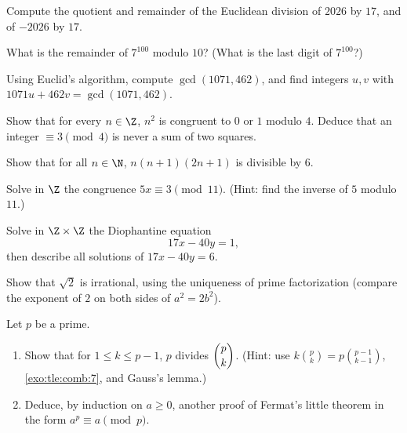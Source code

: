 \begin{exercise}[$\star$]\label{exo:tle:arith:1}
Compute the quotient and remainder of the Euclidean division of $2026$ by
$17$, and of $-2026$ by $17$.
\end{exercise}

\begin{exercise}[$\star$]\label{exo:tle:arith:2}
What is the remainder of $7^{100}$ modulo $10$? (What is the last digit of
$7^{100}$?)
\end{exercise}

\begin{exercise}[$\star$]\label{exo:tle:arith:3}
Using Euclid's algorithm, compute $\gcd(1071, 462)$, and find integers
$u, v$ with $1071u + 462v = \gcd(1071, 462)$.
\end{exercise}

\begin{exercise}[$\star$]\label{exo:tle:arith:4}
Show that for every $n \in \Z$, $n^2$ is congruent to $0$ or $1$ modulo
$4$. Deduce that an integer $\equiv 3 \pmod 4$ is never a sum of two
squares.
\end{exercise}

\begin{exercise}[$\star\star$]\label{exo:tle:arith:5}
Show that for all $n \in \N$, $n(n+1)(2n+1)$ is divisible by $6$.
\end{exercise}

\begin{exercise}[$\star\star$]\label{exo:tle:arith:6}
Solve in $\Z$ the congruence $5x \equiv 3 \pmod{11}$.
(Hint: find the inverse of $5$ modulo $11$.)
\end{exercise}

\begin{exercise}[$\star\star$]\label{exo:tle:arith:7}
Solve in $\Z \times \Z$ the Diophantine equation
\[
17x - 40y = 1,
\]
then describe all solutions of $17x - 40y = 6$.
\end{exercise}

\begin{exercise}[$\star\star$]\label{exo:tle:arith:8}
Show that $\sqrt2$ is irrational, using the uniqueness of prime
factorization (compare the exponent of $2$ on both sides of $a^2 = 2b^2$).
\end{exercise}

\begin{exercise}[$\star\star\star$]\label{exo:tle:arith:9}
Let $p$ be a prime.
\begin{enumerate}
  \item Show that for $1 \leq k \leq p - 1$, $p$ divides $\dbinom{p}{k}$.
        (Hint: use $k\binom pk = p\binom{p-1}{k-1}$, \cref{exo:tle:comb:7},
        and Gauss's lemma.)
  \item Deduce, by induction on $a \geq 0$, another proof of Fermat's little
        theorem in the form $a^p \equiv a \pmod p$.
\end{enumerate}
\end{exercise}

